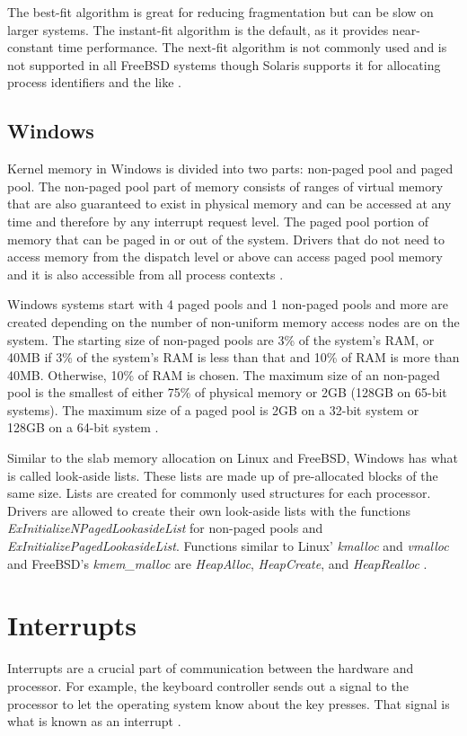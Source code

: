 \documentclass[10pt,draftclsnofoot,onecolumn,journal,compsoc]{IEEEtran}
\begin{document}
The best-fit algorithm is great for reducing fragmentation but can be slow on larger systems. The instant-fit algorithm is the default, as it provides near-constant time performance. The next-fit algorithm is not commonly used and is not supported in all FreeBSD systems though Solaris supports it for allocating process identifiers and the like \cite{bsd_proc}. 

\subsection{Windows}
Kernel memory in Windows is divided into two parts: non-paged pool and paged pool. The non-paged pool part of memory consists of ranges of virtual memory that are also guaranteed to exist in physical memory and can be accessed at any time and therefore by any interrupt request level. The paged pool portion of memory that can be paged in or out of the system. Drivers that do not need to access memory from the dispatch level or above can access paged pool memory and it is also accessible from all process contexts \cite{win_shd}. 

Windows systems start with 4 paged pools and 1 non-paged pools and more are created depending on the number of non-uniform memory access nodes are on the system. The starting size of non-paged pools are 3\% of the system's RAM, or 40MB if 3\% of the system's RAM is less than that and 10\% of RAM is more than 40MB. Otherwise, 10\% of RAM is chosen. The maximum size of an non-paged pool is the smallest of either 75\% of physical memory or 2GB (128GB on 65-bit systems). The maximum size of a paged pool is 2GB on a 32-bit system or 128GB on a 64-bit system \cite{win_shd}. 

Similar to the slab memory allocation on Linux and FreeBSD, Windows has what is called look-aside lists. These lists are made up of pre-allocated blocks of the same size. Lists are created for commonly used structures for each processor. Drivers are allowed to create their own look-aside lists with the functions \textit{ExInitializeNPagedLookasideList} for non-paged pools and \textit{ExInitializePagedLookasideList}. Functions similar to Linux' \textit{kmalloc} and \textit{vmalloc} and FreeBSD's  \textit{kmem\_malloc} are \textit{HeapAlloc}, \textit{HeapCreate}, and \textit{HeapRealloc} \cite{win_shd}. 

\section{Interrupts}
Interrupts are a crucial part of communication between the hardware and processor. For example, the keyboard controller sends out a signal to the processor to let the operating system know about the key presses. That signal is what is known as an interrupt \cite{linux_proc}.
\end{document}
